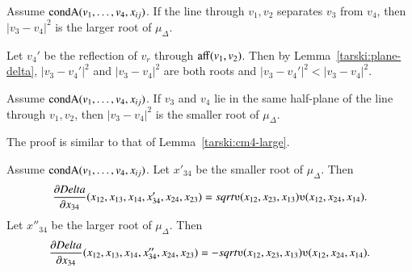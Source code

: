 \begin{tarskidata}
\begin{tarski}

\begin{lemma} 
Assume ${\operatorname{condA}}(v_1,\ldots,v_4,x_{ij})$.
If the line through $v_1,v_2$ separates
$v_3$ from $v_4$, then $|v_3-v_4|^2$ is the larger root of $\mu_\Delta$.
\end{lemma}

\begin{proved}
Let $v_4'$ be the reflection of $v_r$ through ${\operatorname{aff}}(v_1,v_2)$.  Then by
Lemma~\ref{tarski:plane-delta}, 
$|v_3-v_4'|^2$ and $|v_3-v_4|^2$ are both  roots and $|v_3-v_4'|^2 < |v_3-v_4|^2$.
\swallowed\end{proved}
\end{tarski}



\begin{tarski}

\begin{lemma}
Assume ${\operatorname{condA}}(v_1,\ldots,v_4,x_{ij})$.
If $v_3$ and $v_4$ lie in the same half-plane of the line through $v_1,v_2$, then 
 $|v_3-v_4|^2$ is the smaller root of $\mu_\Delta$.
\end{lemma}

\begin{proved}  The proof is similar to that of Lemma~\ref{tarski:cm4-large}.
\swallowed\end{proved}
\end{tarski}




\begin{tarski}

\begin{lemma}
Assume ${\operatorname{condA}}(v_1,\ldots,v_4,x_{ij})$.
Let $x'_{34}$ be the smaller root
of $\mu_\Delta$.  Then
  $$\frac{\partial\Delta}{\partial x_{34}} (x_{12},x_{13},x_{14},
   x'_{34},x_{24},x_{23}) = 
    \sqrt{\ups(x_{12},x_{23},x_{13}) \ups(x_{12},x_{24},x_{14})}.
  $$
Let $x''_{34}$ be the larger root
of $\mu_\Delta$.  Then
  $$\frac{\partial\Delta}{\partial x_{34}} (x_{12},x_{13},x_{14},
   x''_{34},x_{24},x_{23}) = 
    -\sqrt{\ups(x_{12},x_{23},x_{13}) \ups(x_{12},x_{24},x_{14})}.
  $$
\end{lemma}


\end{tarski}
\end{tarskidata}
